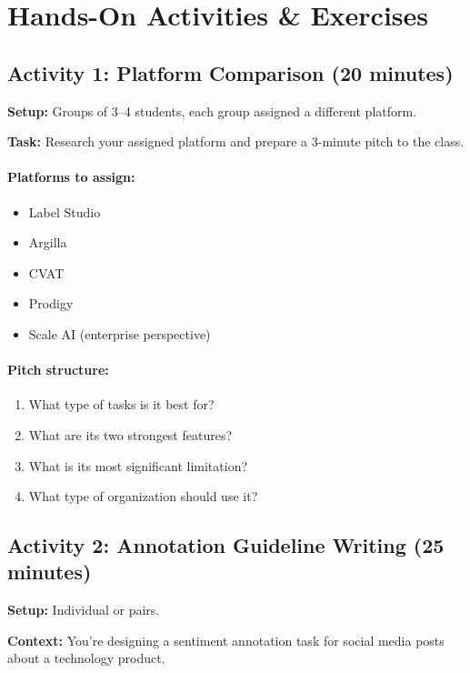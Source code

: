 \section{Hands-On Activities \& Exercises}

\subsection{Activity 1: Platform Comparison (20 minutes)}

\textbf{Setup:} Groups of 3--4 students, each group assigned a different platform.

\textbf{Task:} Research your assigned platform and prepare a 3-minute pitch to the class.

\paragraph{Platforms to assign:}
\begin{itemize}
    \item Label Studio
    \item Argilla
    \item CVAT
    \item Prodigy
    \item Scale AI (enterprise perspective)
\end{itemize}

\paragraph{Pitch structure:}
\begin{enumerate}
    \item What type of tasks is it best for?
    \item What are its two strongest features?
    \item What is its most significant limitation?
    \item What type of organization should use it?
\end{enumerate}

\subsection{Activity 2: Annotation Guideline Writing (25 minutes)}

\textbf{Setup:} Individual or pairs.

\textbf{Context:} You're designing a sentiment annotation task for social media posts about a technology product.

